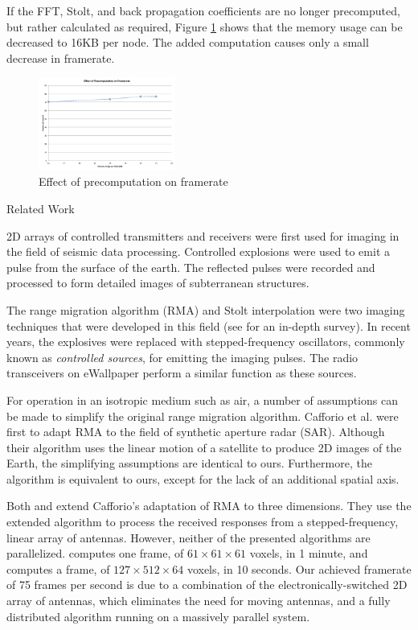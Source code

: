 \documentclass[twocolumn]{article}
\makeatletter
\def\section{\@startsection{section}{1}{\z@}{24pt plus 2 pt
minus 2 pt} {12pt plus 2pt minus 2pt}{\large\bf}}
\makeatother
\begin{document}
If the FFT, Stolt, and back propagation coefficients are no longer precomputed, but rather calculated as required, Figure \ref{precomputation} shows that the memory usage can be decreased to 16KB per node. The added computation causes only a small decrease in framerate.

\begin{figure}[!h]
\centering
\includegraphics*[width=0.4\textwidth]{figures/chart4.pdf}
\caption{Effect of precomputation on framerate}
\label{precomputation}
\end{figure}

\section{Related Work}

2D arrays of controlled transmitters and receivers were first used for imaging in the field of seismic data processing. Controlled explosions were used to emit a pulse from the surface of the earth. The reflected pulses were recorded and processed to form detailed images of subterranean structures. 

The range migration algorithm (RMA) and Stolt interpolation were two imaging techniques that were developed in this field (see \cite{gazdag1984migration} for an in-depth survey). In recent years, the explosives were replaced with stepped-frequency oscillators, commonly known as {\em controlled sources}, for emitting the imaging pulses. The radio transceivers on eWallpaper perform a similar function as these sources. 

For operation in an isotropic medium such as air, a number of assumptions can be made to simplify the original range migration algorithm. Cafforio et al. \cite{sar-data-focussing} were first to adapt RMA to the field of synthetic aperture radar (SAR). Although their algorithm uses the linear motion of a satellite to produce 2D images of the Earth, the simplifying assumptions are identical to ours. Furthermore, the algorithm is equivalent to ours, except for the lack of an additional spatial axis.

Both \cite{lopez20003} and \cite{3d-imaging-concealed-weapon} extend Cafforio's adaptation of RMA to three dimensions. They use the extended algorithm to process the received responses from a stepped-frequency, linear array of antennas. However, neither of the presented algorithms are parallelized. \cite{lopez20003} computes one frame, of $61\times61\times61$ voxels, in 1 minute, and \cite{3d-imaging-concealed-weapon} computes a frame, of $127\times512\times64$ voxels, in 10 seconds. Our achieved framerate of 75 frames per second is due to a combination of the electronically-switched 2D array of antennas, which eliminates the need for moving antennas, and a fully distributed algorithm running on a massively parallel system.
\end{document}
